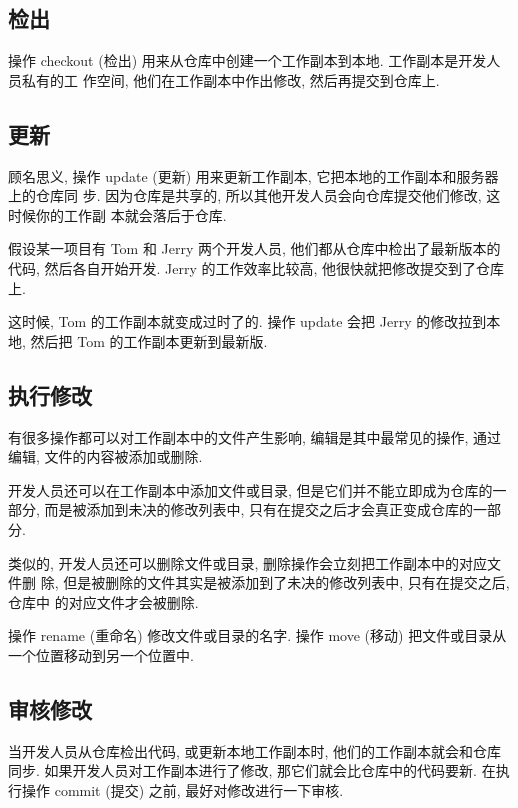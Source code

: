 \documentclass[nofonts, oneside]{ctexart}
\begin{document}
\subsection{检出}
\label{subsec:checkout}

操作 checkout (检出) 用来从仓库中创建一个工作副本到本地. 工作副本是开发人员私有的工
作空间, 他们在工作副本中作出修改, 然后再提交到仓库上.

\subsection{更新}
\label{subsec:update}

顾名思义, 操作 update (更新) 用来更新工作副本, 它把本地的工作副本和服务器上的仓库同
步. 因为仓库是共享的, 所以其他开发人员会向仓库提交他们修改, 这时候你的工作副
本就会落后于仓库.

假设某一项目有 Tom 和 Jerry 两个开发人员, 他们都从仓库中检出了最新版本的代码,
然后各自开始开发. Jerry 的工作效率比较高, 他很快就把修改提交到了仓库上.

这时候, Tom 的工作副本就变成过时了的. 操作 update 会把 Jerry 的修改拉到本地,
然后把 Tom 的工作副本更新到最新版.

\subsection{执行修改}
\label{subsec:perform_changes}

有很多操作都可以对工作副本中的文件产生影响, 编辑是其中最常见的操作, 通过编辑,
文件的内容被添加或删除.

开发人员还可以在工作副本中添加文件或目录, 但是它们并不能立即成为仓库的一部分,
而是被添加到未决的修改列表中, 只有在提交之后才会真正变成仓库的一部分.

类似的, 开发人员还可以删除文件或目录, 删除操作会立刻把工作副本中的对应文件删
除, 但是被删除的文件其实是被添加到了未决的修改列表中, 只有在提交之后, 仓库中
的对应文件才会被删除.

操作 rename (重命名) 修改文件或目录的名字. 操作 move (移动) 把文件或目录从
一个位置移动到另一个位置中.

\subsection{审核修改}
\label{subsec:review_changes}

当开发人员从仓库检出代码, 或更新本地工作副本时, 他们的工作副本就会和仓库同步.
如果开发人员对工作副本进行了修改, 那它们就会比仓库中的代码要新. 在执行操作
commit (提交) 之前, 最好对修改进行一下审核.
\end{document}
